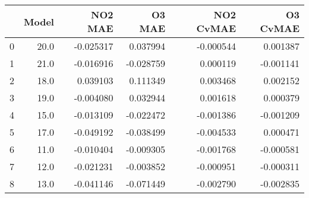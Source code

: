 \begin{tabular}{lrrrrr}
\toprule
{} &  Model &   NO2 MAE &    O3 MAE &  NO2 CvMAE &  O3 CvMAE \\
\midrule
0 &   20.0 & -0.025317 &  0.037994 &  -0.000544 &  0.001387 \\
1 &   21.0 & -0.016916 & -0.028759 &   0.000119 & -0.001141 \\
2 &   18.0 &  0.039103 &  0.111349 &   0.003468 &  0.002152 \\
3 &   19.0 & -0.004080 &  0.032944 &   0.001618 &  0.000379 \\
4 &   15.0 & -0.013109 & -0.022472 &  -0.001386 & -0.001209 \\
5 &   17.0 & -0.049192 & -0.038499 &  -0.004533 &  0.000471 \\
6 &   11.0 & -0.010404 & -0.009305 &  -0.001768 & -0.000581 \\
7 &   12.0 & -0.021231 & -0.003852 &  -0.000951 & -0.000311 \\
8 &   13.0 & -0.041146 & -0.071449 &  -0.002790 & -0.002835 \\
\bottomrule
\end{tabular}
